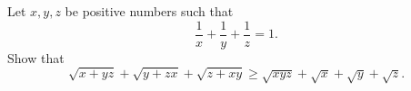 Let $x,y,z$ be positive numbers such that \[ \frac{1}{x}+\frac{1}{y}+\frac{1}{z}=1. \] Show that \[ \sqrt{x+yz}+\sqrt{y+zx}+\sqrt{z+xy}\ge\sqrt{xyz}+\sqrt{x}+\sqrt{y}+\sqrt{z}.\]